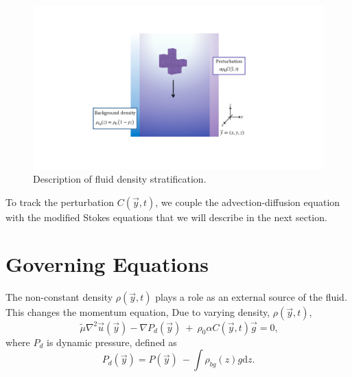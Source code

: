 \begin{figure}[ht]
	\begin{center}
	\includegraphics[scale=0.4]{./figures/fig_stratification_schematics}
	\caption{Description of fluid density stratification.}
	\label{fig_stratification_schematics}
	\end{center}
\end{figure}
To track the perturbation $C(\vec{y},t)$, we couple the advection-diffusion equation with the modified Stokes equations that we will describe in the next section. 
\section{Governing Equations}
The non-constant density $\rho(\vec{y},t)$ plays a role as an external source of the fluid. This changes the momentum equation,
	Due to varying density, $\rho(\vec{y}, t)$, 
		 \begin{equation}
		\ \tilde{\mu}\nabla^2 \vec{u}(\vec{y})
		- \nabla P_d (\vec{y}) \ + \  
		 \rho_0 \alpha C(\vec{y},t) \vec{g} =0 , 
	\label{eq_extra_C}
	\end{equation}
	where $P_d$ is dynamic pressure, defined as
\begin{equation}
	P_d (\vec{y})
	 = P (\vec{y}) \ - \int \rho_{bg}(z) g   \textrm{d}z.
	\label{eq_Pd}
\end{equation}

